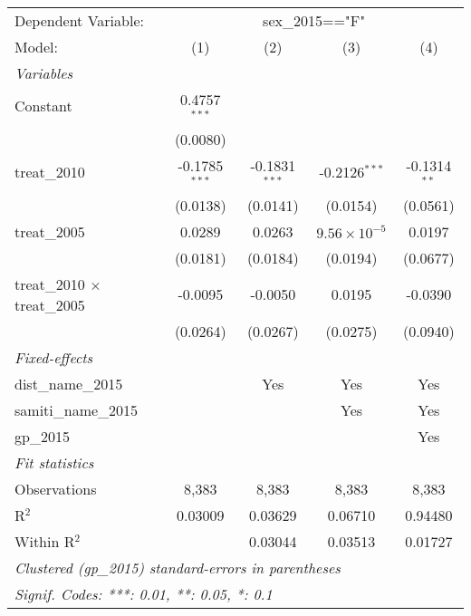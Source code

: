 \begingroup
\centering
\begin{tabular}{lcccc}
   \tabularnewline \midrule \midrule
   Dependent Variable: & \multicolumn{4}{c}{sex\_2015=="F"}\\
   Model:                              & (1)             & (2)             & (3)                   & (4)\\  
   \midrule
   \emph{Variables}\\
   Constant                            & 0.4757$^{***}$  &                 &                       &   \\   
                                       & (0.0080)        &                 &                       &   \\   
   treat\_2010                         & -0.1785$^{***}$ & -0.1831$^{***}$ & -0.2126$^{***}$       & -0.1314$^{**}$\\   
                                       & (0.0138)        & (0.0141)        & (0.0154)              & (0.0561)\\   
   treat\_2005                         & 0.0289          & 0.0263          & $9.56\times 10^{-5}$  & 0.0197\\   
                                       & (0.0181)        & (0.0184)        & (0.0194)              & (0.0677)\\   
   treat\_2010 $\times$ treat\_2005    & -0.0095         & -0.0050         & 0.0195                & -0.0390\\   
                                       & (0.0264)        & (0.0267)        & (0.0275)              & (0.0940)\\   
   \midrule
   \emph{Fixed-effects}\\
   dist\_name\_2015                    &                 & Yes             & Yes                   & Yes\\  
   samiti\_name\_2015                  &                 &                 & Yes                   & Yes\\  
   gp\_2015                            &                 &                 &                       & Yes\\  
   \midrule
   \emph{Fit statistics}\\
   Observations                        & 8,383           & 8,383           & 8,383                 & 8,383\\  
   R$^2$                               & 0.03009         & 0.03629         & 0.06710               & 0.94480\\  
   Within R$^2$                        &                 & 0.03044         & 0.03513               & 0.01727\\  
   \midrule \midrule
   \multicolumn{5}{l}{\emph{Clustered (gp\_2015) standard-errors in parentheses}}\\
   \multicolumn{5}{l}{\emph{Signif. Codes: ***: 0.01, **: 0.05, *: 0.1}}\\
\end{tabular}
\par\endgroup



